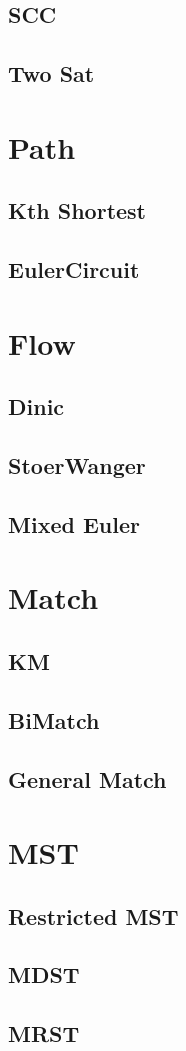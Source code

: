 \documentclass[10pt,twocolumn,oneside]{article}
\begin{document}
    \subsection{SCC}
    
    \subsection{Two Sat}
    

    \section{Path}
    \subsection{Kth Shortest}
    \subsection{EulerCircuit}

    \section{Flow}
    \subsection{Dinic}
    \subsection{StoerWanger}
    \subsection{Mixed Euler}

    \section{Match}
    \subsection{KM}
    \subsection{BiMatch}
    \subsection{General Match}

    \section{MST}
    \subsection{Restricted MST}
    \subsection{MDST}
    \subsection{MRST}



    
\end{document}
